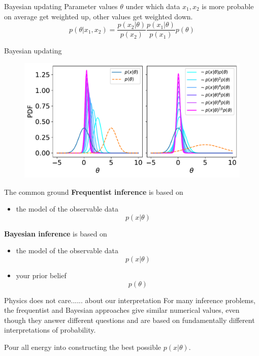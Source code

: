 \documentclass[
aspectratio=169,
14pt,
professionalfonts
]{beamer}
\begin{document}
\begin{frame}{Bayesian updating}
    Parameter values $\theta$ under which data $x_1, x_2$ is more probable on average get weighted up, other values get weighted down.
    $$
    p(\theta | x_1, x_2) = \frac{p(x_2|\theta)}{p(x_2)} \frac{p(x_1|\theta)}{p(x_1)} p(\theta)
    $$
\end{frame}

\begin{frame}{Bayesian updating}
    \begin{figure}
        \centering
        \includegraphics[width=0.9\linewidth]{../plots/updating.pdf}
    \end{figure}
\end{frame}

\begin{frame}{The common ground}
\textbf{Frequentist inference} is based on
\begin{itemize}
    \item the model of the observable data \textbf{$$p(x|\theta)$$}
\end{itemize}
\textbf{Bayesian inference} is based on
\begin{itemize}
    \item the model of the observable data \textbf{$$p(x|\theta)$$}
    \item your prior belief $$p(\theta)$$
\end{itemize}
\end{frame}

\begin{frame}{Physics does not care...}{... about our interpretation}
For many inference problems, the frequentist and Bayesian approaches give similar numerical
values, even though they answer different questions and are based on fundamentally different interpretations of probability.

\vspace{1cm}

Pour all energy into constructing the best possible \textbf{$p(x|\theta)$}.
\end{frame}
\end{document}
